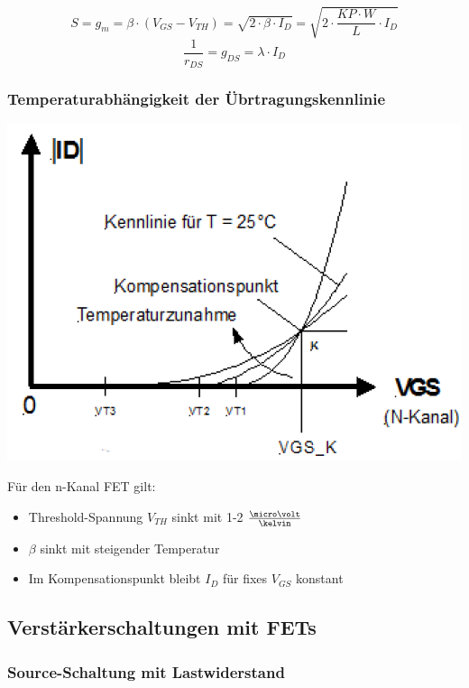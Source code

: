 $$ S = g_m = \beta \cdot (V_{GS} - V_{TH}) = \sqrt{2 \cdot \beta \cdot I_D} = \sqrt{ 2 \cdot \frac{KP \cdot W}{L} \cdot I_D} $$
$$ \frac{1}{r_{DS}} = g_{DS} = \lambda \cdot I_D $$


\subsubsection{Temperaturabhängigkeit der Übrtragungskennlinie}

\begin{minipage}[c]{0.4\columnwidth}
    \includegraphics[width= \columnwidth]{images/mos_fet_eingangskennlinie_temperatur.png}
\end{minipage}
\hfill
\begin{minipage}[c]{0.58\columnwidth}
    Für den n-Kanal FET gilt:
    \begin{itemize}
        \item Threshold-Spannung $V_{TH}$ sinkt mit 1-2 $\frac{\micro \volt}{\kelvin}$
        \item $\beta$ sinkt mit steigender Temperatur
        \item Im Kompensationspunkt bleibt $I_D$ für fixes $V_{GS}$ konstant
    \end{itemize}
\end{minipage}

    
\subsection{Verstärkerschaltungen mit FETs}

\subsubsection{Source-Schaltung mit Lastwiderstand}

